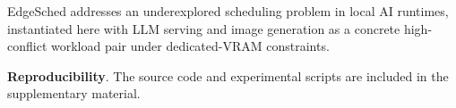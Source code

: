 EdgeSched addresses an underexplored scheduling problem in local AI runtimes, instantiated here with LLM serving and image generation as a concrete high-conflict workload pair under dedicated-VRAM constraints.

\textbf{Reproducibility}. The source code and experimental scripts are included in the supplementary material.
